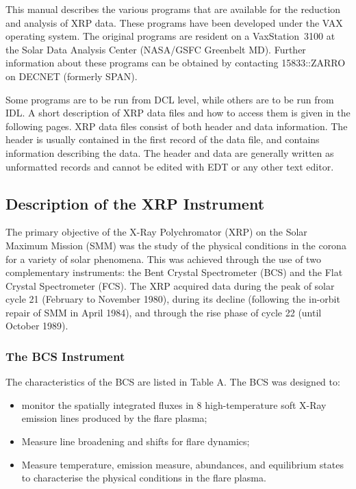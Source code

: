 This manual describes the various programs that are  available for the
reduction and analysis of XRP data. These programs have been developed under
the VAX operating system. The original programs are resident on a
VaxStation~3100 at the Solar Data Analysis Center (NASA/GSFC Greenbelt MD).
Further information about these programs can be obtained by contacting
15833::ZARRO on DECNET (formerly SPAN).

Some programs are to be run from DCL level, while others are to be run from
IDL.  A short description of XRP data files and how to  access them is given in
the following pages. XRP data files consist of both header and data
information. The header is usually contained in the first record of the data
file, and contains information describing the data.  The header and data are
generally written as unformatted records and cannot be edited with EDT or any
other text editor. 
    
\subsection{Description of the XRP Instrument}

The primary objective of the X-Ray Polychromator (XRP) on the Solar Maximum
Mission (SMM) was the study of the physical conditions in the corona for a
variety of solar phenomena. This was achieved through the use of two
complementary instruments: the Bent Crystal Spectrometer (BCS) and the Flat
Crystal Spectrometer (FCS). The XRP acquired data during the peak of solar cycle
21 (February to November 1980), during its decline (following the in-orbit
repair of SMM in April 1984), and through the rise phase of cycle 22 (until
October 1989). 

\subsubsection{The BCS Instrument}

The characteristics of the BCS are listed in Table A. The BCS was designed to:
\begin{itemize}	
\item	 monitor the spatially integrated fluxes in 8 high-temperature soft 
	  X-Ray emission lines produced by the flare plasma;

\item	 Measure line broadening and shifts for flare dynamics;

\item	 Measure temperature, emission measure, abundances, and equilibrium 
	  states to characterise the physical conditions in the flare plasma.

\end{itemize}
 
